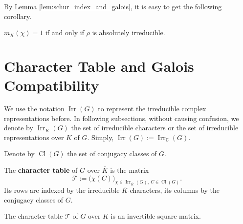 By Lemma \ref{lem:schur_index_and_galois}, it is easy to get the following corollary.

\begin{cor}
\(m_K(\chi) = 1\) if and only if \(\rho\) is absolutely irreducible.
\end{cor}

\section{Character Table and Galois Compatibility}


\begin{notation}
We use the notation $\operatorname{Irr}(G)$ to represent the irreducible complex representations before. In following subsections, without causing confusion, we denote by \(\operatorname{Irr}_{K}(G)\) the set of irreducible characters or the set of irreducible representations over \(K\) of \(G\).
Simply, $\operatorname{Irr}(G):=\operatorname{Irr}_{\mathbb{C}}(G)$.

Denote by \(\operatorname{Cl}(G)\) the set of conjugacy classes of \(G\).
\end{notation}


\begin{defn}
\label{def:char_table}
The \textbf{character table} of \(G\) over \(\overline{K}\) is the matrix
\[
\mathcal T := \bigl( \chi(C) \bigr)_{\chi \in \operatorname{Irr}_{\overline{K}}(G),\ C \in \operatorname{Cl}(G)}.
\]
Its rows are indexed by the irreducible \(\overline{K}\)-characters, its columns by the conjugacy classes of $G$.
\end{defn}

\begin{prop}
\label{prop:char_table_invertible}
The character table \(\mathcal T\) of \(G\) over \(\overline{K}\) is an invertible square matrix.
\end{prop}

